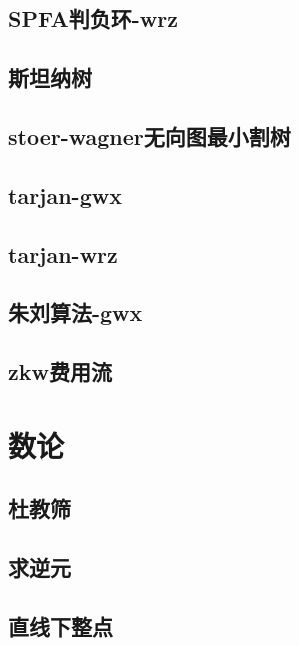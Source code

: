 \documentclass[titlepage,a4paper,10pt]{article}
\begin{document}
\begin{spacing}{0.8}
			\subsection{SPFA判负环-wrz}
				
			\subsection{斯坦纳树}
				
			\subsection{stoer-wagner无向图最小割树}
				
			\subsection{tarjan-gwx}
				
			\subsection{tarjan-wrz}
				
			\subsection{朱刘算法-gwx}
				
			\subsection{zkw费用流}
				
		\section{数论}
			\subsection{杜教筛}
				
			\subsection{求逆元}
				
			\subsection{直线下整点}
				

\end{spacing}
\end{document}
